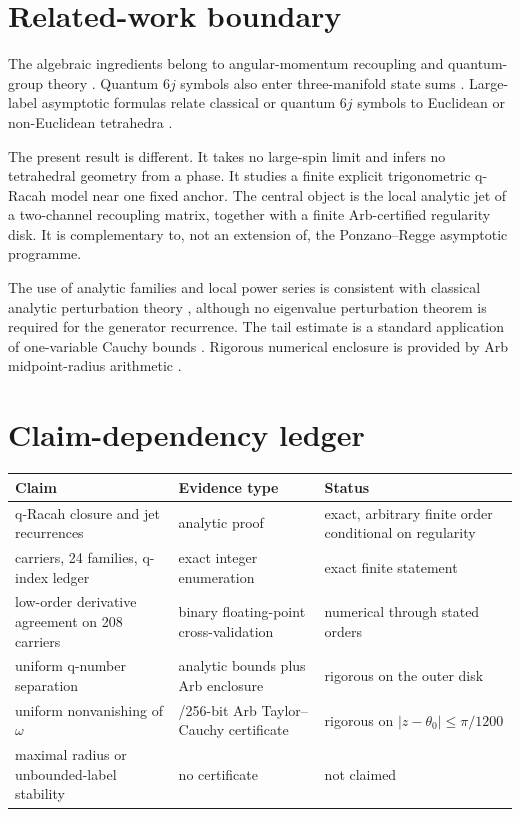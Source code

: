 \section{Related-work boundary}
The algebraic ingredients belong to angular-momentum recoupling and quantum-group theory \cite{biedenharnLouck1981,kirillovReshetikhin1989,kauffmanLins1994}.  Quantum $6j$ symbols also enter three-manifold state sums \cite{turaevViro1992}.  Large-label asymptotic formulas relate classical or quantum $6j$ symbols to Euclidean or non-Euclidean tetrahedra \cite{ponzanoRegge1968,roberts1999,taylorWoodward2005}.

The present result is different.  It takes no large-spin limit and infers no tetrahedral geometry from a phase.  It studies a finite explicit trigonometric q-Racah model near one fixed anchor.  The central object is the local analytic jet of a two-channel recoupling matrix, together with a finite Arb-certified regularity disk.  It is complementary to, not an extension of, the Ponzano--Regge asymptotic programme.

The use of analytic families and local power series is consistent with classical analytic perturbation theory \cite{kato1995}, although no eigenvalue perturbation theorem is required for the generator recurrence.  The tail estimate is a standard application of one-variable Cauchy bounds \cite{ahlfors1979}.  Rigorous numerical enclosure is provided by Arb midpoint-radius arithmetic \cite{johansson2017arb}.

\section{Claim-dependency ledger}
\begin{center}
\begin{tabular}{>{\raggedright\arraybackslash}p{}>{\raggedright\arraybackslash}p{}>{\raggedright\arraybackslash}p{}}
\toprule
Claim & Evidence type & Status\\
\midrule
q-Racah closure and jet recurrences & analytic proof & exact, arbitrary finite order conditional on regularity\\
283 carriers, 24 families, q-index ledger & exact integer enumeration & exact finite statement\\
low-order derivative agreement on 208 carriers & binary floating-point cross-validation & numerical through stated orders\\
uniform q-number separation & analytic bounds plus Arb enclosure & rigorous on the outer disk\\
uniform nonvanishing of $\omega$ & 192/256-bit Arb Taylor--Cauchy certificate & rigorous on $|z-\theta_0|\le\pi/1200$\\
maximal radius or unbounded-label stability & no certificate & not claimed\\
\bottomrule
\end{tabular}
\end{center}


